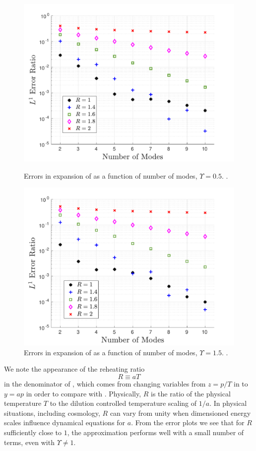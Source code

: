 \begin{figure}
\centerline{\includegraphics[width=0.8\linewidth]{06-appendix/SpectralMethodBoltzmann/Figures/free_stream_f0_approx_Ups_5.pdf}}
\caption{Errors in expansion of  as a function of number of modes, $\Upsilon=0.5$. .}\label{fig:free_stream_f0_approx_Ups_5}
 \centerline{\includegraphics[width=0.8\linewidth]{06-appendix/SpectralMethodBoltzmann/Figures/free_stream_f0_approx_Ups_1_5.pdf}}
\caption{Errors in  expansion of  as a function of number of modes, $\Upsilon=1.5$. .}\label{fig:free_stream_f0_approx_Ups_1_5}
\end{figure}


We note the appearance of the reheating ratio
\begin{equation}\label{reheat}
 R\equiv aT  
\end{equation}
in the denominator of , which comes from changing variables from $z=p/T$ in  to $y=ap$ in order to compare with .  Physically, $R$ is the ratio of the physical temperature $T$ to the dilution controlled temperature scaling  of $1/a$.   In physical situations, including cosmology, $R$ can vary from unity when dimensioned energy scales influence dynamical equations for $a$. From the error plots we see that for $R$ sufficiently close to $1$, the approximation performs well with a small number of terms, even with $\Upsilon\neq 1$.  




